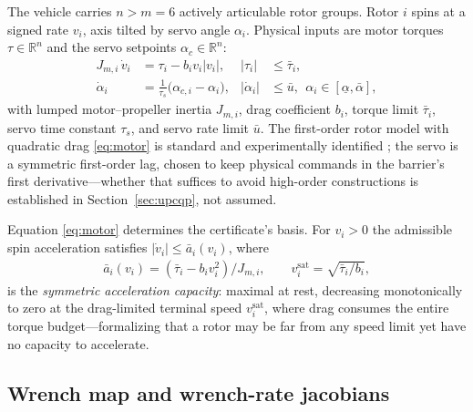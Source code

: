 \documentclass[letter, 10 pt, journal, twoside]{IEEEtran}
\theoremstyle{compact}
\begin{document}
The vehicle carries $n>m=6$ actively articulable rotor groups. Rotor $i$ spins at a signed rate $v_i$, axis tilted by servo angle $\alpha_i$. Physical inputs are motor torques $\tau\in\mathbb{R}^n$ and the servo setpoints $\alpha_c\in\mathbb{R}^n$:
%
\begin{align}
    J_{m,i}\,\dot v_i &= \tau_i - b_i v_i|v_i|, & |\tau_i| &\le \bar\tau_i,
    \label{eq:motor}\\
    \dot\alpha_i &= \tfrac{1}{\tau_s}\big(\alpha_{c,i}-\alpha_i\big), &
    |\dot\alpha_i| &\le \bar u, \ \ \alpha_i\in[\underline\alpha, \bar\alpha],
    \label{eq:servo}
\end{align}
%
with lumped motor--propeller inertia $J_{m,i}$, drag coefficient $b_i$, torque limit $\bar\tau_i$, servo time constant $\tau_s$, and servo rate limit $\bar u$. The first-order rotor model with quadratic drag \eqref{eq:motor} is standard and experimentally identified \cite{Bicego2020}; the servo is a symmetric first-order lag, chosen to keep physical commands in the barrier's first derivative---whether that suffices to avoid high-order constructions \cite{Breeden2021} is established in Section~\ref{sec:upcqp}, not assumed.

Equation \eqref{eq:motor} determines the certificate's basis. For $v_i>0$ the admissible spin acceleration satisfies $|\dot v_i|\le \bar a_i(v_i)$, where
%
\begin{align}
    \bar a_i(v_i) = (\bar\tau_i - b_i v_i^2)/J_{m,i},
    \qquad
    v_i^{\mathrm{sat}} = \sqrt{\bar\tau_i/b_i},
    \label{eq:abar}
\end{align}
%
is the \emph{symmetric acceleration capacity}: maximal at rest, decreasing monotonically to zero at the drag-limited terminal speed $v_i^{\mathrm{sat}}$, where drag consumes the entire torque budget---formalizing that a rotor may be far from any speed limit yet have no capacity to accelerate.



\subsection{Wrench map and wrench-rate jacobians}
\end{document}
